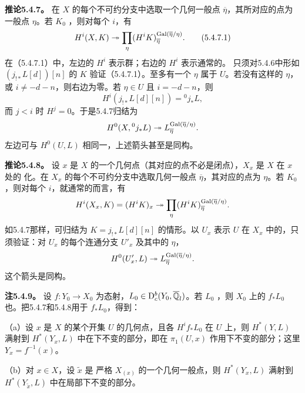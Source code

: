 \par\medskip\noindent\textbf{推论5.4.7。} 在 $X$ 的每个不可约分支中选取一个几何一般点 $\overline\eta$，其所对应的点为一般点 $\eta$。若 $K_0$ ，则对每个 $i$，有
\begin{equation*}
H^i(X,K)\twoheadrightarrow\prod_\eta(H^iK)_{\overline\eta}^{\operatorname{Gal}(\overline\eta/\eta)}.\tag{5.4.7.1}
\end{equation*}
在（5.4.7.1）中，左边的 $H^i$ 表示群；右边的 $H^i$ 表示通常的。
只须对5.4.6中形如 $(j_{!*}L[d])[n]$ 的 $K$ 验证（5.4.7.1）。至多有一个 $\eta$ 属于 $U$。若没有这样的 $\eta$，或 $i\ne-d-n$，则右边为零。若 $\eta\in U$ 且 $i=-d-n$，则
\[
H^i(j_{!*}L[d][n])={}^0j_*L,
\]
而 $j<i$ 时 $H^j=0$。于是5.4.7归结为
\[
H^0(X,{}^0j_*L)\twoheadrightarrow L_{\overline\eta}^{\operatorname{Gal}(\overline\eta/\eta)}.
\]
左边可与 $H^0(U,L)$ 相同一，上述箭头甚至是同构。

\par\medskip\noindent\textbf{推论5.4.8。} 设 $x$ 是 $X$ 的一个几何点（其对应的点不必是闭点），$X_x$ 是 $X$ 在 $x$ 处的 化。在 $X_x$ 的每个不可约分支中选取几何一般点 $\overline\eta$，其对应的点为 $\eta$。若 $K_0$ ，则对每个 $i$，就通常的而言，有
\[
H^i(X_x,K)=(H^iK)_x\twoheadrightarrow\prod_\eta(H^iK)_{\overline\eta}^{\operatorname{Gal}(\overline\eta/\eta)}.
\]
如5.4.7那样，可归结为 $K=j_{!*}L[d][n]$ 的情形。以 $U_x$ 表示 $U$ 在 $X_x$ 中的，只须验证：对 $U_x$ 的每个连通分支 $U'_x$ 及其中的 $\eta$，
\[
H^0(U'_x,L)\twoheadrightarrow L_{\overline\eta}^{\operatorname{Gal}(\overline\eta/\eta)}.
\]
这个箭头是同构。

\par\medskip\noindent\textbf{注5.4.9。} 设 $f:Y_0\to X_0$ 为态射，$L_0\in\mathrm{D}_c^b(Y_0,\overline{\mathbb Q}_l)$。若 $L_0$ ，则 $X_0$ 上的 $f_*L_0$ 也。把5.4.7和5.4.8用于 $f_*L_0$，得到：

（a）设 $x$ 是 $X$ 的某个开集 $U$ 的几何点，且各 $H^if_*L_0$ 在 $U$ 上，则 $H^*(Y,L)$ 满射到 $H^*(Y_x,L)$ 中在下不变的部分，即在 $\pi_1(U,x)$ 作用下不变的部分；这里 $Y_x=f^{-1}(x)$。

（b）对 $x\in X$，设 $\widetilde x$ 是
严格 $X_{(x)}$ 的一个几何一般点，则 $H^*(Y_x,L)$ 满射到 $H^*(Y_{\widetilde x},L)$ 中在局部下不变的部分。

